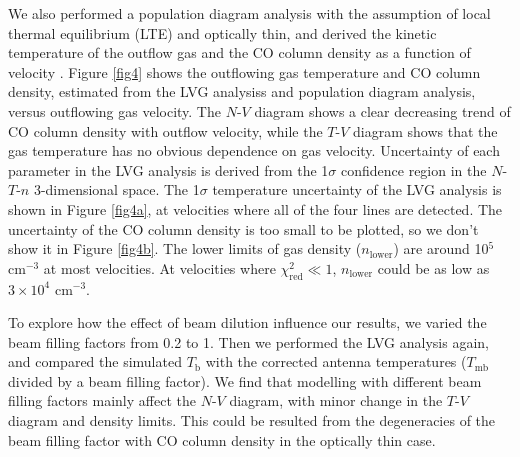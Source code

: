 We also performed a population diagram analysis with the assumption of local thermal equilibrium (LTE) and optically thin, and derived the kinetic temperature of the outflow gas and the CO column density as a function of velocity \citep{1999ApJ...517..209G}. Figure \ref{fig4} shows the outflowing gas temperature and CO column density, estimated from the LVG analysiss and population diagram analysis, versus outflowing gas velocity. The $N$-$V$ diagram shows a clear decreasing trend of CO column density with outflow velocity, while the $T$-$V$ diagram shows that the gas temperature has no obvious dependence on gas velocity. Uncertainty of each parameter in the LVG analysis is derived from the 1$\sigma$ confidence region in the $N$-$T$-$n$ 3-dimensional space. The 1$\sigma$ temperature uncertainty of the LVG analysis is shown in Figure \ref{fig4a}, at velocities where all of the four lines are detected. The uncertainty of the CO column density is too small to be plotted, so we don't show it in Figure \ref{fig4b}. The lower limits of gas density ($n_{\mathrm{lower}}$) are around 10$^5$ cm$^{-3}$ at most velocities. At velocities where $\chi_{\mathrm{red}}^2 \ll 1$, $n_{\mathrm{lower}}$ could be as low as $3 \times 10^4$ cm$^{-3}$.

To explore how the effect of beam dilution influence our results, we varied the beam filling factors from 0.2 to 1. Then we performed the LVG analysis again, and compared the simulated $T_\mathrm{b}$ with the corrected antenna temperatures ($T_{\mathrm{mb}}$ divided by a beam filling factor). We find that modelling with different beam filling factors mainly affect the $N$-$V$ diagram, with minor change in the $T$-$V$ diagram and density limits. This could be resulted from the degeneracies of the beam filling factor with CO column density in the optically thin case. 




